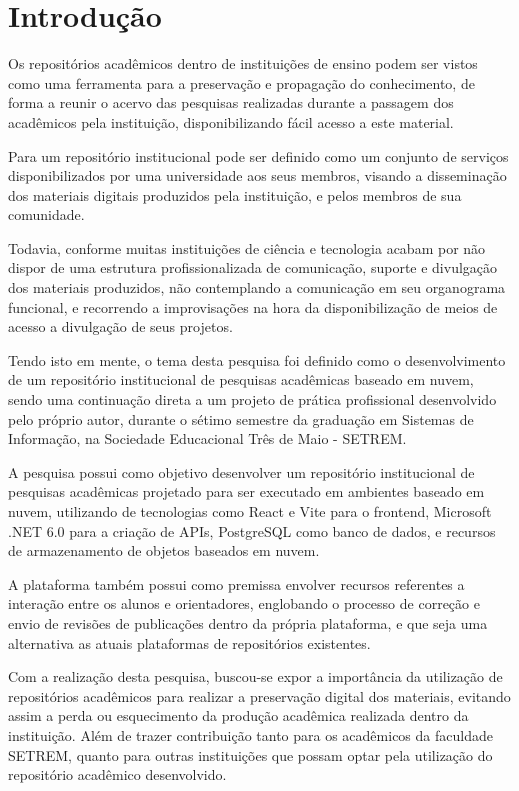\chapter*{Introdução} \label{chap:intro}

Os repositórios acadêmicos dentro de instituições de ensino
podem ser vistos como uma ferramenta para a preservação
e propagação do conhecimento, de forma a reunir o acervo das
pesquisas realizadas durante a passagem dos acadêmicos
pela instituição, disponibilizando fácil acesso a este
material.

Para \cite{LYNCH:2003} um repositório institucional pode
ser definido como um conjunto de serviços disponibilizados
por uma universidade aos seus membros, visando a disseminação
dos materiais digitais produzidos pela instituição, e pelos
membros de sua comunidade.

Todavia, conforme \cite{PORTO:difusao_cientifica_recortes}
muitas instituições de ciência e tecnologia acabam por não
dispor de uma estrutura profissionalizada de comunicação,
suporte e divulgação dos materiais produzidos, não contemplando
a comunicação em seu organograma funcional, e recorrendo a
improvisações na hora da disponibilização de meios de acesso
a divulgação de seus projetos.

Tendo isto em mente, o tema desta pesquisa foi definido como
o desenvolvimento de um repositório institucional de pesquisas
acadêmicas baseado em nuvem, sendo uma continuação direta a um
projeto de prática profissional desenvolvido pelo próprio autor,
durante o sétimo semestre da graduação em Sistemas de Informação, na
Sociedade Educacional Três de Maio - SETREM.

A pesquisa possui como objetivo desenvolver um repositório institucional
de pesquisas acadêmicas projetado para ser executado em ambientes
baseado em nuvem, utilizando de tecnologias como React e Vite para o
frontend, Microsoft .NET 6.0 para a criação de APIs, PostgreSQL como banco
de dados, e recursos de armazenamento de objetos baseados em nuvem.

A plataforma também possui como premissa envolver recursos referentes
a interação entre os alunos e orientadores, englobando o processo de correção
e envio de revisões de publicações dentro da própria plataforma, e que seja
uma alternativa as atuais plataformas de repositórios existentes.

Com a realização desta pesquisa, buscou-se expor a
importância da utilização de repositórios acadêmicos para realizar
a preservação digital dos materiais, evitando assim a perda
ou esquecimento da produção acadêmica realizada dentro da instituição.
Além de trazer contribuição tanto para os acadêmicos da faculdade SETREM, quanto para outras
instituições que possam optar pela utilização do repositório
acadêmico desenvolvido.

